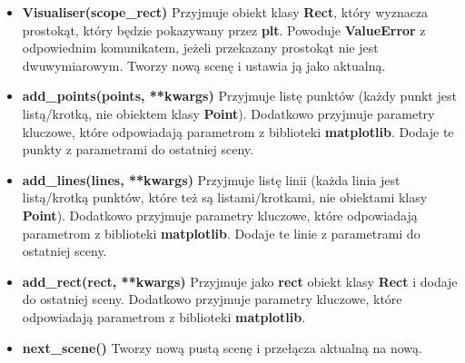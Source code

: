 \documentclass[a4paper, 12pt]{article}
\begin{document}
      \begin{itemize}
          \item \textbf{Visualiser(scope\_rect)} \vspace{6pt}\newline
          \quad Przyjmuje obiekt klasy \textbf{Rect}, który wyznacza prostokąt, który będzie pokazywany przez \textbf{plt}. Powoduje \textbf{ValueError} z odpowiednim komunikatem, jeżeli przekazany prostokąt nie jest dwuwymiarowym. Tworzy nową scenę i ustawia ją jako aktualną.
          \vspace{6pt}
          
          \item \textbf{add\_points(points, **kwargs)} \vspace{6pt}\newline
          \quad Przyjmuje listę punktów (każdy punkt jest listą/krotką, nie obiektem klasy \textbf{Point}). Dodatkowo przyjmuje parametry kluczowe, które odpowiadają parametrom z biblioteki \textbf{matplotlib}. Dodaje te punkty z parametrami do ostatniej sceny.
          \vspace{6pt}
          
          \item \textbf{add\_lines(lines, **kwargs)} \vspace{6pt}\newline
          \quad Przyjmuje listę linii (każda linia jest listą/krotką punktów, które też są listami/krotkami, nie obiektami klasy \textbf{Point}). Dodatkowo przyjmuje parametry kluczowe, które odpowiadają parametrom z biblioteki \textbf{matplotlib}. Dodaje te linie z parametrami do ostatniej sceny.
          \vspace{6pt}
          
          \item \textbf{add\_rect(rect, **kwargs)} \vspace{6pt}\newline
          \quad Przyjmuje jako \textbf{rect} obiekt klasy \textbf{Rect} i dodaje do ostatniej sceny. Dodatkowo przyjmuje parametry kluczowe, które odpowiadają parametrom z biblioteki \textbf{matplotlib}.
          \vspace{6pt}
          
          \item \textbf{next\_scene()} \vspace{6pt}\newline
          \quad Tworzy nową pustą scenę i przełącza aktualną na nową.
          \vspace{6pt}
          

\end{itemize}
\end{document}
